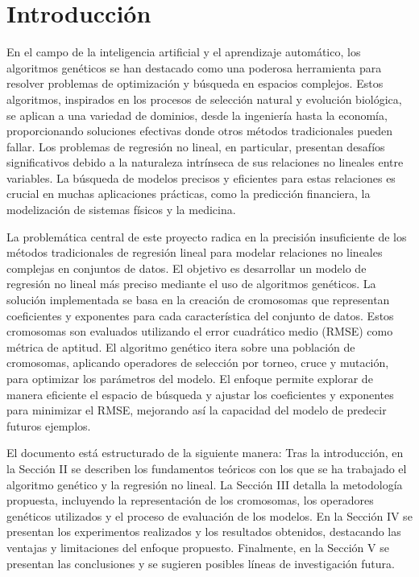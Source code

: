 \documentclass[conference,a4paper]{IEEEtran}
\begin{document}
\section{Introducción}

En el campo de la inteligencia artificial y el aprendizaje automático, los algoritmos genéticos se han destacado como una poderosa herramienta para resolver problemas de optimización y búsqueda en espacios complejos. Estos algoritmos, inspirados en los procesos de selección natural y evolución biológica, se aplican a una variedad de dominios, desde la ingeniería hasta la economía, proporcionando soluciones efectivas donde otros métodos tradicionales pueden fallar. Los problemas de regresión no lineal, en particular, presentan desafíos significativos debido a la naturaleza intrínseca de sus relaciones no lineales entre variables. La búsqueda de modelos precisos y eficientes para estas relaciones es crucial en muchas aplicaciones prácticas, como la predicción financiera, la modelización de sistemas físicos y la medicina.

La problemática central de este proyecto radica en la precisión insuficiente de los métodos tradicionales de regresión lineal para modelar relaciones no lineales complejas en conjuntos de datos. El objetivo es desarrollar un modelo de regresión no lineal más preciso mediante el uso de algoritmos genéticos. La solución implementada se basa en la creación de cromosomas que representan coeficientes y exponentes para cada característica del conjunto de datos. Estos cromosomas son evaluados utilizando el error cuadrático medio (RMSE) como métrica de aptitud. El algoritmo genético itera sobre una población de cromosomas, aplicando operadores de selección por torneo, cruce y mutación, para optimizar los parámetros del modelo. El enfoque permite explorar de manera eficiente el espacio de búsqueda y ajustar los coeficientes y exponentes para minimizar el RMSE, mejorando así la capacidad del modelo de predecir futuros ejemplos.

El documento está estructurado de la siguiente manera: Tras la introducción, en la Sección II se describen los fundamentos teóricos con los que se ha trabajado el algoritmo genético y la regresión no lineal. La Sección III detalla la metodología propuesta, incluyendo la representación de los cromosomas, los operadores genéticos utilizados y el proceso de evaluación de los modelos. En la Sección IV se presentan los experimentos realizados y los resultados obtenidos, destacando las ventajas y limitaciones del enfoque propuesto. Finalmente, en la Sección V se presentan las conclusiones y se sugieren posibles líneas de investigación futura.
\end{document}

